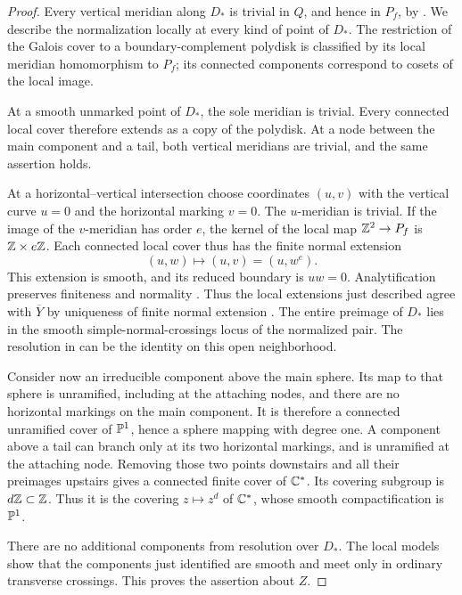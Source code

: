 \begin{proof}
Every vertical meridian along $D_*$ is trivial in $Q$, and hence in
$P_f$, by .  We describe the
normalization locally at every kind of point of $D_*$.  The
restriction of the Galois cover to a boundary-complement polydisk
is classified by its local meridian homomorphism to $P_f$; its
connected components correspond to cosets of the local image.

At a smooth unmarked point of $D_*$, the sole meridian is trivial.
Every connected local cover therefore extends as a copy of the
polydisk.  At a node between the main component and a tail, both
vertical meridians are trivial, and the same assertion holds.

At a horizontal--vertical intersection choose coordinates $(u,v)$
with the vertical curve $u=0$ and the horizontal marking $v=0$.
The $u$-meridian is trivial.  If the image of the $v$-meridian has
order $e$, the kernel of the local map $\mathbb Z^2\to P_f$ is
$\mathbb Z\times e\mathbb Z$.  Each connected local cover thus has the finite
normal extension
\begin{equation}
  (u,w)\longmapsto (u,v)=(u,w^e).
  \label{eq:distinguished-local-cover}
\end{equation}
This extension is smooth, and its reduced boundary is $uw=0$.
Analytification preserves finiteness and normality
\citep[Expos\'e XII, Propositions~2.1(vi) and 3.2(vi)]{SGA1}.
Thus the local extensions just described agree with $\overline Y$ by
uniqueness of finite normal extension
\citep[Expos\'e XII, Proposition~5.3]{SGA1}. The entire preimage of $D_*$
lies in the smooth simple-normal-crossings locus of the normalized
pair.  The resolution in  can be the
identity on this open neighborhood.



Consider now an irreducible component above the main sphere.
Its map to that sphere is unramified, including at the attaching
nodes, and there are no horizontal markings on the main component.
It is therefore a connected unramified cover of $\mathbb P^1$, hence a
sphere mapping with degree one.  A component above a tail can branch
only at its two horizontal markings, and is unramified at the
attaching node.  Removing those two points downstairs and all their preimages upstairs
gives a connected finite cover of $\mathbb C^*$. Its covering subgroup is
$d\mathbb Z\subset\mathbb Z$.  Thus it is the covering $z\mapsto z^d$ of $\mathbb C^*$,
whose smooth compactification is $\mathbb P^1$.

There are no additional components from resolution over $D_*$.
The local models show that the components just identified are
smooth and meet only in ordinary transverse crossings.  This
proves the assertion about $Z$.
\end{proof}

